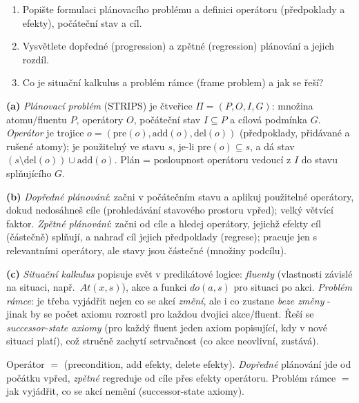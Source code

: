 \begin{zadani}
\begin{enumerate}[label=(\alph*)]
  \item {} Popište formulaci plánovacího problému a definici operátoru (předpoklady a efekty), počáteční stav a cíl.
  \item {} Vysvětlete dopředné (progression) a zpětné (regression) plánování a jejich rozdíl.
  \item {} Co je situační kalkulus a problém rámce (frame problem) a jak se řeší?
\end{enumerate}
\end{zadani}

\begin{reseni}
\textbf{(a)} \emph{Plánovací problém} (STRIPS) je čtveřice $\Pi=(P,O,I,G)$: množina atomu/fluentu $P$, operátory $O$, počáteční stav $I\subseteq P$ a cílová podmínka $G$. \emph{Operátor} je trojice $o=(\mathrm{pre}(o),\mathrm{add}(o),\mathrm{del}(o))$ (předpoklady, přidávané a rušené atomy); je použitelný ve stavu $s$, je-li $\mathrm{pre}(o)\subseteq s$, a dá stav $(s\setminus\mathrm{del}(o))\cup\mathrm{add}(o)$. Plán = posloupnost operátoru vedoucí z $I$ do stavu splňujícího $G$.

\textbf{(b)} \emph{Dopředné plánování}: začni v počátečním stavu a aplikuj použitelné operátory, dokud nedosáhneš cíle (prohledávání stavového prostoru vpřed); velký větvící faktor. \emph{Zpětné plánování}: začni od cíle a hledej operátory, jejichž efekty cíl (částečně) splňují, a nahraď cíl jejich předpoklady (regrese); pracuje jen s relevantními operátory, ale stavy jsou částečné (množiny podcílu).

\textbf{(c)} \emph{Situační kalkulus} popisuje svět v predikátové logice: \emph{fluenty} (vlastnosti závislé na situaci, např.\ $At(x,s)$), akce a funkci $do(a,s)$ pro situaci po akci. \emph{Problém rámce}: je třeba vyjádřit nejen co se akcí \emph{změní}, ale i co zustane \emph{beze změny} - jinak by se počet axiomu rozrostl pro každou dvojici akce/fluent. Řeší se \emph{successor-state axiomy} (pro každý fluent jeden axiom popisující, kdy v nové situaci platí), což stručně zachytí setrvačnost (co akce neovlivní, zustává).
\end{reseni}

\begin{jadro}
Operátor $=$ (precondition, add efekty, delete efekty). \emph{Dopředné} plánování jde od počátku vpřed, \emph{zpětné} regreduje od cíle přes efekty operátoru. Problém rámce $=$ jak vyjádřit, co se akcí nemění (successor-state axiomy).
\end{jadro}

